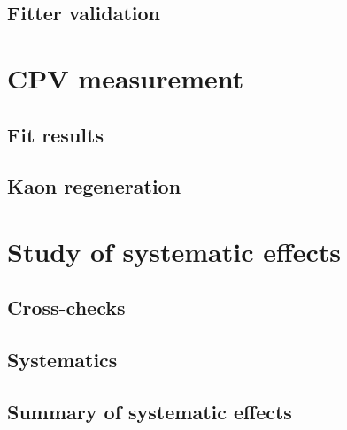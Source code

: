 \subsection{Fitter validation}
\section{CPV measurement}
\subsection{Fit results}
\subsection{Kaon regeneration}
\section{Study of systematic effects}
\subsection{Cross-checks}
\subsection{Systematics}
\subsection{Summary of systematic effects}
